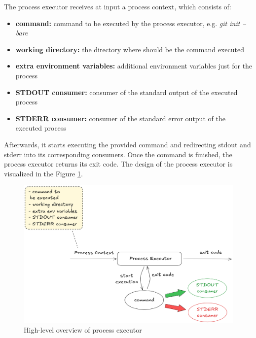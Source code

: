 \documentclass[../main.tex]{subfiles}
\begin{document}
The process executor receives at input a process context, which consists of:
\begin{itemize}
    \item \textbf{command:} command to be executed by the process executor, e.g. \textit{git init --bare}

    \item \textbf{working directory:} the directory where should be the command executed

    \item \textbf{extra environment variables:} additional environment variables just for the process

    \item \textbf{STDOUT consumer:} consumer of the standard output of the executed process

    \item \textbf{STDERR consumer:} consumer of the standard error output of the executed process
\end{itemize}

Afterwards, it starts executing the provided command and redirecting stdout and stderr into its corresponding consumers. Once the command is finished, the process executor returns its exit code. The design of the process executor is visualized in the Figure \ref{fig:process-executor}.

\begin{figure}
  \begin{center}
    \includegraphics[width=\textwidth]{images/process-executor.png}
  \end{center}
  \caption{High-level overview of process executor}
  \label{fig:process-executor}
\end{figure}
\end{document}
